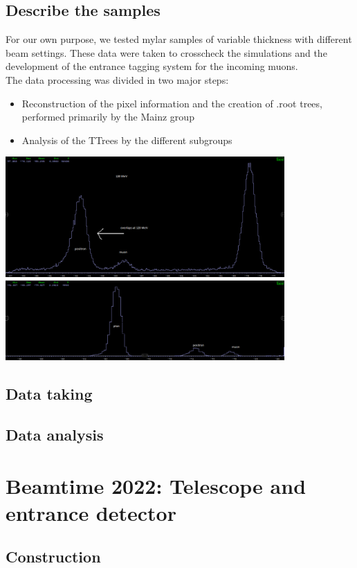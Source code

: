 \begin{refsection}
\subsection{Describe the samples}
For our own purpose, we tested mylar samples of variable thickness with different beam settings. These data were taken to crosscheck the simulations and the development of the entrance tagging system for the incoming muons.\\
The data processing was divided in two major steps:
\begin{itemize}
    \item Reconstruction of the pixel information and the creation of .root trees, performed primarily by the Mainz group
    \item Analysis of the TTrees by the different subgroups
\end{itemize}


\includegraphics[width=0.8\textwidth]{Figures/muEDM_Dec2021/TOFAllEnergies130.png}\\
\includegraphics[width=0.8\textwidth]{Figures/muEDM_Dec2021/TOFMediumCut125.png}


\subsection{Data taking}
\subsection{Data analysis}
\section{Beamtime 2022: Telescope and entrance detector}
\subsection{Construction}

\end{refsection}
